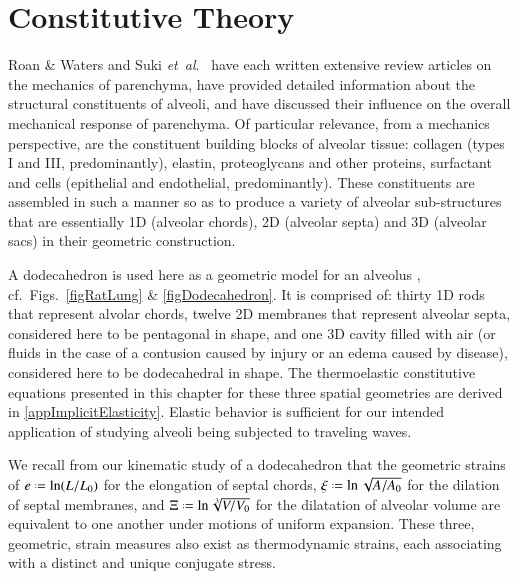 \part{Constitutive Theory}
\label{partConstitutive}

Roan \& Waters \cite{RoanWaters11} and Suki \textit{et~al}.\ \cite{Sukietal05,Sukietal11} have each written extensive review articles on the mechanics of parenchyma, have provided detailed information about the structural constituents of alveoli, and have discussed their influence on the overall mechanical response of parenchyma.  Of particular relevance, from a mechanics perspective, are the constituent building blocks of alveolar tissue: collagen (types I and III, predominantly), elastin, proteoglycans and other proteins, surfactant and cells (epithelial and endothelial, predominantly).  These constituents are assembled in such a manner so as to produce a variety of alveolar sub-structures that are essentially 1D (alveolar chords), 2D (alveolar septa) and 3D (alveolar sacs) in their geometric construction.

A dodecahedron is used here as a geometric model for an alveolus \cite{FrankusLee74}, cf.\ Figs.~\ref{figRatLung} \& \ref{figDodecahedron}.  It is comprised of: thirty 1D rods that represent alvolar chords, twelve 2D membranes that represent alveolar septa, considered here to be pentagonal in shape, and one 3D cavity filled with air (or fluids in the case of a contusion caused by injury or an edema caused by disease), considered here to be dodecahedral in shape.  The thermo\-elastic constitutive equations presented in this chapter for these three spatial geometries are derived in \ref{appImplicitElasticity}.  Elastic behavior is sufficient for our intended application of studying alveoli being subjected to traveling waves.

We recall from our kinematic study of a dodecahedron that the geometric strains of $e \defeq \ln ( L / L_0 )$ for the elongation of septal chords, $\xi \defeq \ln \sqrt{A / A_0}$ for the dilation of septal membranes, and $\Xi \defeq \ln \sqrt[3]{V / V_0}$ for the dilatation of alveolar volume are equivalent to one another under motions of uniform expansion.  These three, geometric, strain measures also exist as thermo\-dynamic strains, each associating with a distinct and unique conjugate stress.

